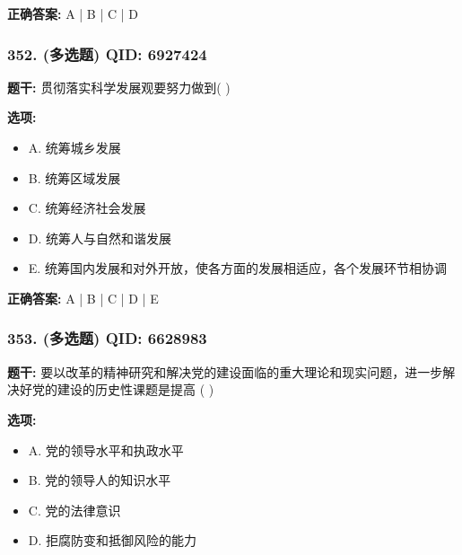 \documentclass[12pt,UTF8]{ctexart}
\begin{document}
\textbf{正确答案:}
A | B | C | D

\vspace{0.3em}\hrulefill\vspace{0.7em}

\subsubsection*{352. (多选题) \small QID: 6927424}

\textbf{题干:}
贯彻落实科学发展观要努力做到(  )

\textbf{选项:}
\begin{itemize}[leftmargin=*]

  \item A. 统筹城乡发展

  \item B. 统筹区域发展

  \item C. 统筹经济社会发展

  \item D. 统筹人与自然和谐发展

  \item E. 统筹国内发展和对外开放，使各方面的发展相适应，各个发展环节相协调

\end{itemize}

\textbf{正确答案:}
A | B | C | D | E

\vspace{0.3em}\hrulefill\vspace{0.7em}

\subsubsection*{353. (多选题) \small QID: 6628983}

\textbf{题干:}
要以改革的精神研究和解决党的建设面临的重大理论和现实问题，进一步解决好党的建设的历史性课题是提高  ( )

\textbf{选项:}
\begin{itemize}[leftmargin=*]

  \item A. 党的领导水平和执政水平

  \item B. 党的领导人的知识水平

  \item C. 党的法律意识

  \item D. 拒腐防变和抵御风险的能力

\end{itemize}
\end{document}
